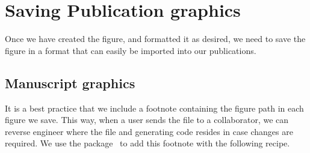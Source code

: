 \documentclass[nojss, letterpaper]{jss}\usepackage[]{graphicx}\usepackage[]{color}
\begin{document}
\section{Saving Publication graphics}\label{S:saving}

Once we have created the figure, and formatted it as desired, we need to save the figure in a format that can easily be imported into our publications. 

\subsection{Manuscript graphics}

It is a best practice that we include a footnote containing the figure path in each figure we save. This way, when a user sends the file to a collaborator, we can reverse engineer where the file and generating code resides in case changes are required. We use the  package~\citep{Auguie:2012} to add this footnote with the following recipe.
\end{document}
